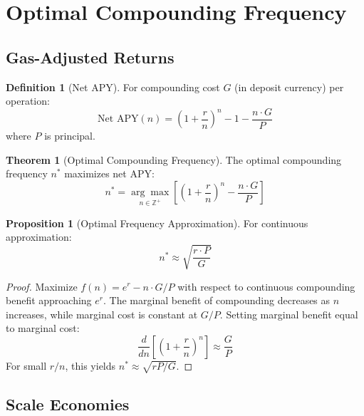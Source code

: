 \documentclass[11pt,a4paper]{article}
\theoremstyle{definition}
\newtheorem{definition}{Definition}
\newtheorem{theorem}{Theorem}
\newtheorem{proposition}{Proposition}
\begin{document}
\section{Optimal Compounding Frequency}

\subsection{Gas-Adjusted Returns}

\begin{definition}[Net APY]
For compounding cost $G$ (in deposit currency) per operation:
\begin{equation}
\text{Net APY}(n) = \left(1 + \frac{r}{n}\right)^n - 1 - \frac{n \cdot G}{P}
\end{equation}
where $P$ is principal.
\end{definition}

\begin{theorem}[Optimal Compounding Frequency]
The optimal compounding frequency $n^*$ maximizes net APY:
\begin{equation}
n^* = \underset{n \in \mathbb{Z}^+}{\arg\max} \left[\left(1 + \frac{r}{n}\right)^n - \frac{n \cdot G}{P}\right]
\end{equation}
\end{theorem}

\begin{proposition}[Optimal Frequency Approximation]
For continuous approximation:
\begin{equation}
n^* \approx \sqrt{\frac{r \cdot P}{G}}
\end{equation}
\end{proposition}

\begin{proof}
Maximize $f(n) = e^r - n \cdot G/P$ with respect to continuous compounding benefit approaching $e^r$. The marginal benefit of compounding decreases as $n$ increases, while marginal cost is constant at $G/P$. Setting marginal benefit equal to marginal cost:
\begin{equation}
\frac{d}{dn}\left[\left(1 + \frac{r}{n}\right)^n\right] \approx \frac{G}{P}
\end{equation}
For small $r/n$, this yields $n^* \approx \sqrt{rP/G}$.
\end{proof}

\subsection{Scale Economies}
\end{document}
